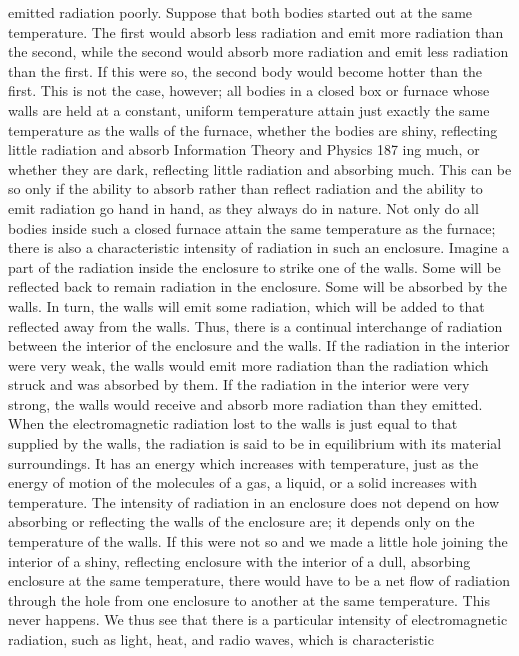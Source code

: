 {{{{{{{{{{{emitted radiation poorly. Suppose that both bodies started out at
the same temperature. The first would absorb less radiation and
emit more radiation than the second, while the second would
absorb more radiation and emit less radiation than the first. If this
were so, the second body would become hotter than the first.
This is not the case, however; all bodies in a closed box or
furnace whose walls are held at a constant, uniform temperature
attain just exactly the same temperature as the walls of the furnace,
whether the bodies are shiny, reflecting little radiation and absorb
Information Theory and Physics 187
ing much, or whether they are dark, reflecting little radiation and
absorbing much. This can be so only if the ability to absorb rather
than reflect radiation and the ability to emit radiation go hand in
hand, as they always do in nature.
Not only do all bodies inside such a closed furnace attain the
same temperature as the furnace; there is also a characteristic
intensity of radiation in such an enclosure. Imagine a part of the
radiation inside the enclosure to strike one of the walls. Some will
be reflected back to remain radiation in the enclosure. Some will
be absorbed by the walls. In turn, the walls will emit some radiation,
which will be added to that reflected away from the walls.
Thus, there is a continual interchange of radiation between the
interior of the enclosure and the walls.
If the radiation in the interior were very weak, the walls would
emit more radiation than the radiation which struck and was
absorbed by them. If the radiation in the interior were very strong,
the walls would receive and absorb more radiation than they
emitted. When the electromagnetic radiation lost to the walls is
just equal to that supplied by the walls, the radiation is said to be
in equilibrium with its material surroundings. It has an energy
which increases with temperature, just as the energy of motion
of the molecules of a gas, a liquid, or a solid increases with
temperature.
The intensity of radiation in an enclosure does not depend on
how absorbing or reflecting the walls of the enclosure are; it
depends only on the temperature of the walls. If this were not so
and we made a little hole joining the interior of a shiny, reflecting
enclosure with the interior of a dull, absorbing enclosure at the
same temperature, there would have to be a net flow of radiation
through the hole from one enclosure to another at the same temperature.
This never happens.
We thus see that there is a particular intensity of electromagnetic
radiation, such as light, heat, and radio waves, which is characteristic
}}}}}}}}}}}
